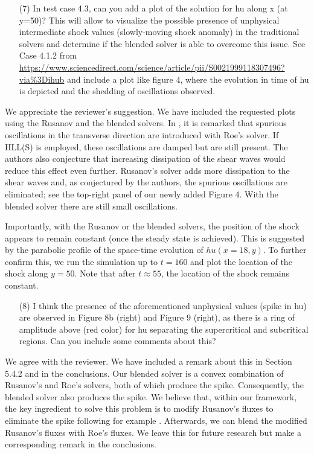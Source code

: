 \documentclass[english,11pt]{article}
\begin{document}
\bigskip
{\color{OliveGreen}
  \begin{itemize}
  \item[(7)]
    In test case 4.3, can you add a plot of the solution for hu along x (at y=50)? 
    This will allow to visualize the possible presence of unphysical intermediate shock values 
    (slowly-moving shock anomaly) in the traditional solvers and determine if the blended solver 
    is able to overcome this issue. 
    See Case 4.1.2 from \url{https://www.sciencedirect.com/science/article/pii/S0021999118307496?via\%3Dihub}
    and include a plot like figure 4, where the evolution in time of hu is depicted and the shedding of 
    oscillations observed.
  \end{itemize}
}
\noindent
We appreciate the reviewer's suggestion. 
We have included the requested plots using the Rusanov and the blended solvers.
In \cite[Section 4.1.2]{navas2019improved}, it is remarked that spurious oscillations in the transverse direction
are introduced with Roe's solver. If HLL(S) is employed, these oscillations are damped but are still present.
The authors also conjecture that increasing dissipation of the shear waves would reduce this effect even further.
Rusanov's solver adds more dissipation to the shear waves and, as conjectured by the authors,
the spurious oscillations are eliminated; see the top-right panel of our newly added Figure 4.
With the blended solver there are still small oscillations. 

Importantly, with the Rusanov or the blended solvers, the position of the shock appears to remain constant
(once the steady state is achieved). This is suggested by the parabolic profile of the space-time evolution of $hu(x=18,y)$.
To further confirm this, we run the simulation up to $t=160$ and plot the location of the shock along $y=50$.
Note that after $t\approx 55$, the location of the shock remains constant.


\bigskip
{\color{OliveGreen}
  \begin{itemize}
  \item[(8)]
    I think the presence of the aforementioned unphysical values (spike in hu) are observed in Figure 8b (right) 
    and Figure 9 (right), as there is a ring of amplitude above (red color) for hu separating the supercritical 
    and subcritical regions. Can you include some comments about this?
  \end{itemize}
}
\noindent
We agree with the reviewer. We have included a remark about this in Section 5.4.2 and in the conclusions.
Our blended solver is a convex combination of Rusanov's and Roe's solvers,
both of which produce the spike. Consequently, the blended solver also produces the spike. 
We believe that, within our framework, the key ingredient to solve this problem is to modify
Rusanov's fluxes to eliminate the spike following for example \cite[Section 5.1]{navas2019improved}.
Afterwards, we can blend the modified Rusanov's fluxes with Roe's fluxes.
We leave this for future research but make a corresponding remark in the conclusions. 
\end{document}
